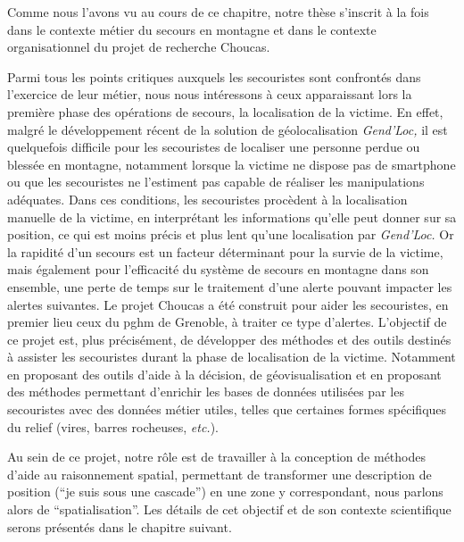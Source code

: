 Comme nous l'avons vu au cours de ce chapitre, notre thèse s'inscrit à
la fois dans le contexte métier du secours en montagne et dans
le contexte organisationnel du projet de recherche Choucas.

Parmi tous les points critiques auxquels les secouristes sont
confrontés dans l'exercice de leur métier, nous nous intéressons à
ceux apparaissant lors la première phase des opérations de secours, la
localisation de la victime. En effet, malgré le développement récent
de la solution de géolocalisation \emph{Gend'Loc,} il est quelquefois
difficile pour les secouristes de localiser une personne perdue ou
blessée en montagne, notamment lorsque la victime ne dispose pas de
smartphone ou que les secouristes ne l'estiment pas capable de
réaliser les manipulations adéquates. Dans ces conditions, les
secouristes procèdent à la localisation manuelle de la victime, en
interprétant les informations qu'elle peut donner sur sa position, ce
qui est moins précis et plus lent qu'une localisation par
\emph{Gend'Loc.} Or la rapidité d'un secours est un facteur
déterminant pour la survie de la victime, mais également pour
l'efficacité du système de secours en montagne dans son ensemble, une
perte de temps sur le traitement d'une alerte pouvant impacter les
alertes suivantes. Le projet Choucas a été construit pour aider les
secouristes, en premier lieu ceux du \ac{pghm} de Grenoble, à traiter
ce type d'alertes. L'objectif de ce projet est, plus précisément, de
développer des méthodes et des outils destinés à assister les
secouristes durant la phase de localisation de la victime. Notamment
en proposant des outils d'aide à la décision, de géovisualisation et
en proposant des méthodes permettant d'enrichir les bases de données
utilisées par les secouristes avec des données métier utiles, telles
que certaines formes spécifiques du relief (\eg vires, barres
rocheuses, \emph{etc.}).

Au sein de ce projet, notre rôle est de travailler à la conception de
méthodes d'aide au raisonnement spatial, permettant de transformer une
description de position (\eg \enquote{je suis sous une cascade}) en
une zone y correspondant, nous parlons alors de
\enquote{spatialisation}. Les détails de cet objectif et de son
contexte scientifique serons présentés dans le chapitre suivant.


